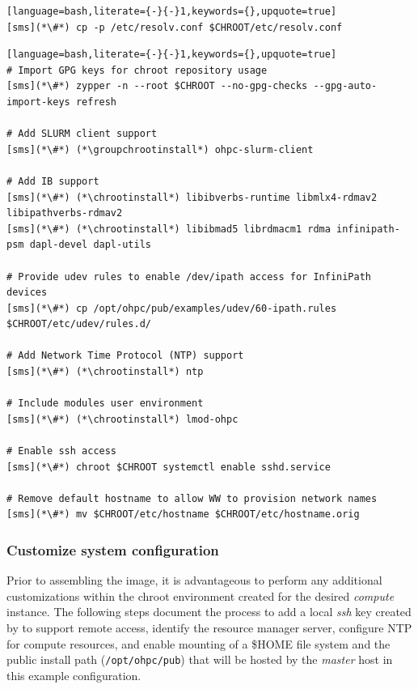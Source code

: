 \documentclass[letterpaper]{article}
\newcommand{\chrootinstall}{zypper -n --root \$CHROOT install}
\newcommand{\groupchrootinstall}{zypper -n --root \$CHROOT install -t pattern}
\begin{document}
\begin{lstlisting}[language=bash,literate={-}{-}1,keywords={},upquote=true]
[sms](*\#*) cp -p /etc/resolv.conf $CHROOT/etc/resolv.conf
\end{lstlisting}

\begin{lstlisting}[language=bash,literate={-}{-}1,keywords={},upquote=true]
# Import GPG keys for chroot repository usage
[sms](*\#*) zypper -n --root $CHROOT --no-gpg-checks --gpg-auto-import-keys refresh

# Add SLURM client support
[sms](*\#*) (*\groupchrootinstall*) ohpc-slurm-client

# Add IB support
[sms](*\#*) (*\chrootinstall*) libibverbs-runtime libmlx4-rdmav2 libipathverbs-rdmav2
[sms](*\#*) (*\chrootinstall*) libibmad5 librdmacm1 rdma infinipath-psm dapl-devel dapl-utils

# Provide udev rules to enable /dev/ipath access for InfiniPath devices
[sms](*\#*) cp /opt/ohpc/pub/examples/udev/60-ipath.rules $CHROOT/etc/udev/rules.d/

# Add Network Time Protocol (NTP) support
[sms](*\#*) (*\chrootinstall*) ntp

# Include modules user environment
[sms](*\#*) (*\chrootinstall*) lmod-ohpc

# Enable ssh access 
[sms](*\#*) chroot $CHROOT systemctl enable sshd.service

# Remove default hostname to allow WW to provision network names
[sms](*\#*) mv $CHROOT/etc/hostname $CHROOT/etc/hostname.orig
\end{lstlisting}

\subsubsection{Customize system configuration} \label{sec:master_customization}

Prior to assembling the image, it is advantageous to perform any additional
customizations within the chroot environment created for the desired {\em
 compute} instance. The following steps document the process to add a local
{\em ssh} key created by \Warewulf{} to support remote access, identify the
resource manager server, configure NTP for compute resources, and enable \NFS{}
mounting of a \$HOME file system and the public \OHPC{} install path
(\texttt{/opt/ohpc/pub}) that will be hosted by the {\em master} host in this
example configuration.
\end{document}
